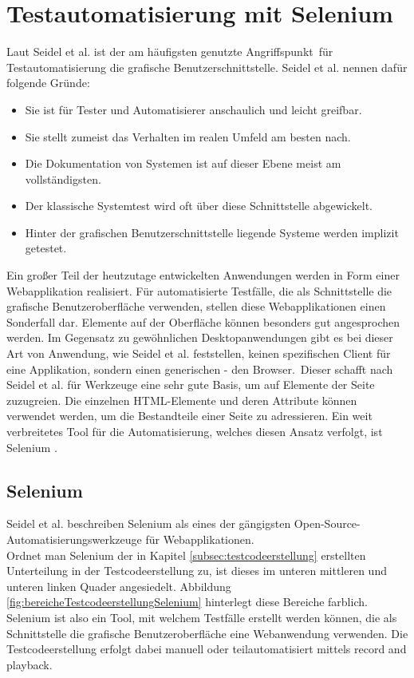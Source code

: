 \chapter{Testautomatisierung mit Selenium}
\label{sec:testautomatisierung_mit_selenium}

Laut Seidel et al. \cite[vgl. S. 48]{seidl_basiswissen_2012} ist der am häufigsten genutzte \frqq Angriffspunkt\flqq\ für Testautomatisierung die grafische Benutzerschnittstelle. Seidel et al. \cite[S. 48]{seidl_basiswissen_2012} nennen dafür folgende Gründe:
\begin{itemize}
\item \glqq Sie ist für Tester und Automatisierer anschaulich und leicht greifbar.\grqq
\item \glqq Sie stellt zumeist das Verhalten im realen Umfeld am besten nach.\grqq
\item \glqq Die Dokumentation von Systemen ist auf dieser Ebene meist am vollständigsten.\grqq
\item \glqq Der klassische Systemtest wird oft über diese Schnittstelle abgewickelt.\grqq
\item \glqq Hinter der grafischen Benutzerschnittstelle liegende Systeme werden implizit getestet.\grqq
\end{itemize}
Ein großer Teil der heutzutage entwickelten Anwendungen werden in Form einer Webapplikation realisiert. Für automatisierte Testfälle, die als Schnittstelle die grafische Benutzeroberfläche verwenden, stellen diese Webapplikationen einen Sonderfall dar. Elemente auf der Oberfläche können besonders gut angesprochen werden.
Im Gegensatz zu gewöhnlichen Desktopanwendungen gibt es bei dieser Art von Anwendung, wie Seidel et al. \cite[vgl. S. 88]{seidl_basiswissen_2012} feststellen, \glqq keinen spezifischen Client für eine Applikation, sondern einen generischen - den Browser.\grqq\ Dieser schafft nach Seidel et al.  \cite[vgl. S. 59]{seidl_basiswissen_2012} für Werkzeuge eine sehr  gute Basis, um auf Elemente der Seite zuzugreien. Die einzelnen HTML-Elemente und deren Attribute können verwendet werden, um die Bestandteile einer Seite zu adressieren.
Ein weit verbreitetes Tool für die Automatisierung, welches diesen Ansatz verfolgt, ist Selenium \cite{selenium_selenium_2015}.
\section{Selenium}
\label{sec:selenium}
Seidel et al. \cite[S. 142]{seidl_basiswissen_2012} beschreiben Selenium als \glqq eines der gängigsten Open-Source-Automatisierungswerkzeuge für Webapplikationen.\grqq\\
Ordnet man Selenium der in Kapitel \ref{subsec:testcodeerstellung} erstellten Unterteilung in der Testcodeerstellung zu, ist dieses im unteren mittleren und unteren linken Quader angesiedelt. Abbildung \ref{fig:bereicheTestcodeerstellungSelenium} hinterlegt diese Bereiche farblich.
Selenium ist also ein Tool, mit welchem Testfälle erstellt werden können, die als Schnittstelle die grafische Benutzeroberfläche eine Webanwendung verwenden. Die Testcodeerstellung erfolgt dabei manuell oder teilautomatisiert mittels \grq record and playback\grq.\\

